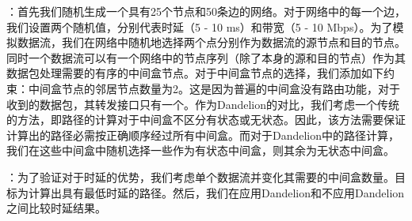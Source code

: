 \documentclass{ctexart}
\newcommand{\para}[1]{\noindent {\bf #1}}%
\begin{document}

\para{实验方法}：首先我们随机生成一个具有25个节点和50条边的网络。对于网络中的每一个边，我们设置两个随机值，分别代表时延（5 - 10 ms）和带宽（5 - 10 Mbps）。为了模拟数据流，我们在网络中随机地选择两个点分别作为数据流的源节点和目的节点。同时一个数据流可以有一个网络中的节点序列（除了本身的源和目的节点）作为其数据包处理需要的有序的中间盒节点。对于中间盒节点的选择，我们添加如下约束：中间盒节点的邻居节点数量为2。这是因为普遍的中间盒没有路由功能，对于收到的数据包，其转发接口只有一个。作为Dandelion的对比，我们考虑一个传统的方法，即路径的计算对于中间盒不区分有状态或无状态。因此，该方法需要保证计算出的路径必需按正确顺序经过所有中间盒。而对于Dandelion中的路径计算，我们在这些中间盒中随机选择一些作为有状态中间盒，则其余为无状态中间盒。


\para{时延}：为了验证对于时延的优势，我们考虑单个数据流并变化其需要的中间盒数量。目标为计算出具有最低时延的路径。然后，我们在应用Dandelion和不应用Dandelion之间比较时延结果。
\end{document}
